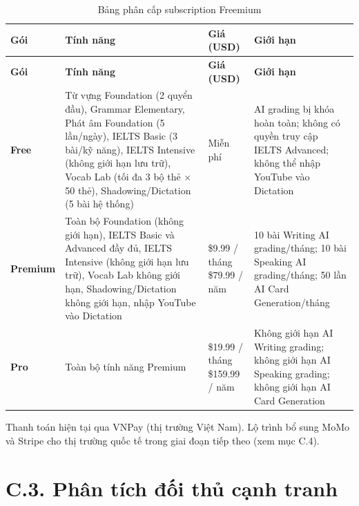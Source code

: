\setlength{\tbu}{\dimexpr(\linewidth - 8\tabcolsep - 5\arrayrulewidth)/140\relax}
\begin{longtable}{|p{22\tbu}|p{48\tbu}|p{28\tbu}|p{42\tbu}|}
    \caption{Bảng phân cấp subscription Freemium}
    \label{tab:freemium} \\
    \hline
    \textbf{Gói} & \textbf{Tính năng} & \textbf{Giá (USD)} & \textbf{Giới hạn} \\ \hline
    \endfirsthead
    \hline
    \textbf{Gói} & \textbf{Tính năng} & \textbf{Giá (USD)} & \textbf{Giới hạn} \\ \hline
    \endhead
    \hline
    \endfoot
    \hline
    \endlastfoot
    \textbf{Free}
      & Từ vựng Foundation (2 quyển đầu), Grammar Elementary, Phát âm Foundation (5 lần/ngày), IELTS Basic (3 bài/kỹ năng), IELTS Intensive (không giới hạn lưu trữ), Vocab Lab (tối đa 3 bộ thẻ $\times$ 50 thẻ), Shadowing/Dictation (5 bài hệ thống)
      & Miễn phí
      & AI grading bị khóa hoàn toàn; không có quyền truy cập IELTS Advanced; không thể nhập YouTube vào Dictation \\ \hline
    \textbf{Premium}
      & Toàn bộ Foundation (không giới hạn), IELTS Basic và Advanced đầy đủ, IELTS Intensive (không giới hạn lưu trữ), Vocab Lab không giới hạn, Shadowing/Dictation không giới hạn, nhập YouTube vào Dictation
      & \$9.99 / tháng \newline \$79.99 / năm
      & 10 bài Writing AI grading/tháng; 10 bài Speaking AI grading/tháng; 50 lần AI Card Generation/tháng \\ \hline
    \textbf{Pro}
      & Toàn bộ tính năng Premium
      & \$19.99 / tháng \newline \$159.99 / năm
      & Không giới hạn AI Writing grading; không giới hạn AI Speaking grading; không giới hạn AI Card Generation \\ \hline
\end{longtable}

Thanh toán hiện tại qua VNPay (thị trường Việt Nam). Lộ trình bổ sung MoMo và Stripe cho thị trường quốc tế trong giai đoạn tiếp theo (xem mục C.4).

\section*{C.3. Phân tích đối thủ cạnh tranh}

